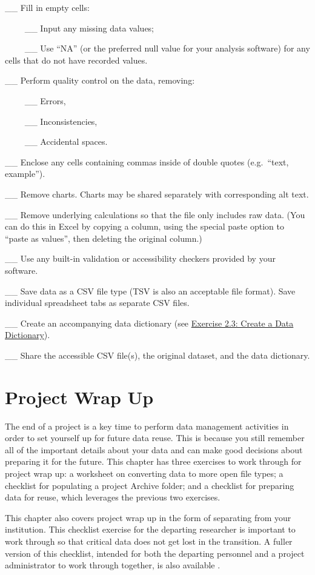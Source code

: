 \documentclass[
]{book}
\begin{document}
\_\_ Fill in empty cells:

~~~~ \_\_ Input any missing data values;

~~~~ \_\_ Use ``NA'' (or the preferred null value for your analysis software) for any cells that do not have recorded values.

\_\_ Perform quality control on the data, removing:

~~~~ \_\_ Errors,

~~~~ \_\_ Inconsistencies,

~~~~ \_\_ Accidental spaces.

\_\_ Enclose any cells containing commas inside of double quotes (e.g.~``text, example'').

\_\_ Remove charts. Charts may be shared separately with corresponding alt text.

\_\_ Remove underlying calculations so that the file only includes raw data. (You can do this in Excel by copying a column, using the special paste option to ``paste as values'', then deleting the original column.)

\_\_ Use any built-in validation or accessibility checkers provided by your software.

\_\_ Save data as a CSV file type (TSV is also an acceptable file format). Save individual spreadsheet tabs as separate CSV files.

\_\_ Create an accompanying data dictionary (see \protect\hyperlink{data-dictionary}{Exercise 2.3: Create a Data Dictionary}).

\_\_ Share the accessible CSV file(s), the original dataset, and the data dictionary.

\hypertarget{project-wrap-up}{%
\chapter{Project Wrap Up}\label{project-wrap-up}}

The end of a project is a key time to perform data management activities in order to set yourself up for future data reuse. This is because you still remember all of the important details about your data and can make good decisions about preparing it for the future. This chapter has three exercises to work through for project wrap up: a worksheet on converting data to more open file types; a checklist for populating a project Archive folder; and a checklist for preparing data for reuse, which leverages the previous two exercises.

This chapter also covers project wrap up in the form of separating from your institution. This checklist exercise for the departing researcher is important to work through so that critical data does not get lost in the transition. A fuller version of this checklist, intended for both the departing personnel and a project administrator to work through together, is also available \citep{goben_data_2023}.
\end{document}
